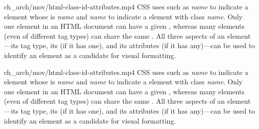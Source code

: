 %
{ch_arch/mov/html-class-id-attributes.mp4}{%
CSS uses  such as \emph{name} to
indicate a  element whose  is \emph{name} and
\emph{name} to indicate a  element with class \emph{name}.
Only one element in an HTML document can have a given , whereas many
elements (even of different tag types) can share the same .
All three aspects of an element---its tag type, its  (if it has
one), and its  attributes (if it has any)---can be used to
identify an element as a candidate for visual formatting.
}


%
{ch_arch/mov/html-class-id-attributes.mp4}{%
CSS uses  such as \emph{name} to
indicate a  element whose  is \emph{name} and
\emph{name} to indicate a  element with class \emph{name}.
Only one element in an HTML document can have a given , whereas many
elements (even of different tag types) can share the same .
All three aspects of an element---its tag type, its  (if it has
one), and its  attributes (if it has any)---can be used to
identify an element as a candidate for visual formatting.
}
